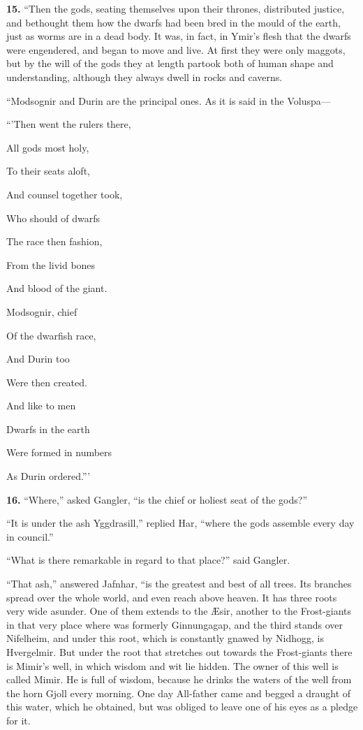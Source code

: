 \textbf{15.} ``Then the gods, seating themselves upon their thrones,
distributed justice, and bethought them how the dwarfs had been bred
in the mould of the earth, just as worms are in a dead body. It was,
in fact, in Ymir's flesh that the dwarfs were engendered, and began to
move and live. At first they were only maggots, but by the will of the
gods they at length partook both of human shape and understanding,
although they always dwell in rocks and caverns.

``Modsognir and Durin are the principal ones. As it is said in the
Voluspa—

``'Then went the rulers there,

All gods most holy,

To their seats aloft,

And counsel together took,

Who should of dwarfs

The race then fashion,

From the livid bones

And blood of the giant.

Modsognir, chief

Of the dwarfish race,

And Durin too

Were then created.

And like to men

Dwarfs in the earth

Were formed in numbers

As Durin ordered.'''


\textbf{16.} ``Where,'' asked Gangler, ``is the chief or holiest seat of
the gods?''

``It is under the ash Yggdrasill,'' replied Har, ``where the gods
assemble every day in council.''

``What is there remarkable in regard to that place?'' said Gangler.

``That ash,'' answered Jafnhar, ``is the greatest and best of all trees.
Its branches spread over the whole world, and even reach above heaven.
It has three roots very wide asunder. One of them extends to the Æsir,
another to the Frost-giants in that very place where was formerly
Ginnungagap, and the third stands over Nifelheim, and under this root,
which is constantly gnawed by Nidhogg, is Hvergelmir. But under the
root that stretches out towards the Frost-giants there is Mimir's
well, in which wisdom and wit lie hidden. The owner of this well is
called Mimir. He is full of wisdom, because he drinks the waters of
the well from the horn Gjoll every morning. One day All-father came
and begged a draught of this water, which he obtained, but was obliged
to leave one of his eyes as a pledge for it.

